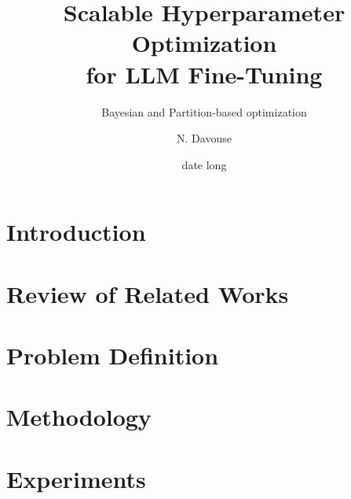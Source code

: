\documentclass[A4,svgnames,9pt,aspectratio=169]{beamer}
\title[titrecourt]{Scalable Hyperparameter Optimization\\ for LLM
Fine-Tuning}
\subtitle{Bayesian and Partition-based optimization}
\date[20/01/2025]{date long}
\author[A. et al.]{N. Davouse}
\begin{document}

\frame{\titlepage}


\renewcommand{\contentsname}{Summary}



\frame{\tocpage}

\section{Introduction}
\frame{\sectionpage}


\section{Review of Related Works}
\frame{\sectionpage}


\section{Problem Definition}
\frame{\sectionpage}


\section{Methodology}
\frame{\sectionpage}


\section{Experiments}
\frame{\sectionpage}

\end{document}
